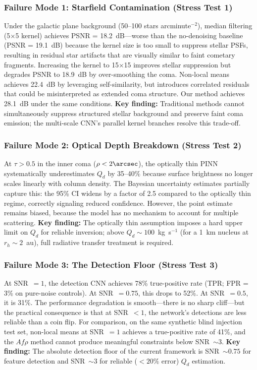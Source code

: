 \documentclass[usenatbib]{mnras}
\begin{document}
\subsubsection{Failure Mode 1: Starfield Contamination (Stress Test 1)}

Under the galactic plane background (50--100 stars arcminute$^{-2}$), median filtering (5$\times$5 kernel) achieves PSNR = 18.2~dB---worse than the no-denoising baseline (PSNR = 19.1~dB) because the kernel size is too small to suppress stellar PSFs, resulting in residual star artifacts that are visually similar to faint cometary fragments. Increasing the kernel to 15$\times$15 improves stellar suppression but degrades PSNR to 18.9~dB by over-smoothing the coma. Non-local means achieves 22.4~dB by leveraging self-similarity, but introduces correlated residuals that could be misinterpreted as extended coma structure. Our method achieves 28.1~dB under the same conditions. \textbf{Key finding:} Traditional methods cannot simultaneously suppress structured stellar background and preserve faint coma emission; the multi-scale CNN's parallel kernel branches resolve this trade-off.

\subsubsection{Failure Mode 2: Optical Depth Breakdown (Stress Test 2)}

At $\tau > 0.5$ in the inner coma ($\rho < 2\arcsec$), the optically thin PINN systematically underestimates $Q_d$ by 35--40\% because surface brightness no longer scales linearly with column density. The Bayesian uncertainty estimates partially capture this: the 95\% CI widens by a factor of 2.5 compared to the optically thin regime, correctly signaling reduced confidence. However, the point estimate remains biased, because the model has no mechanism to account for multiple scattering. \textbf{Key finding:} The optically thin assumption imposes a hard upper limit on $Q_d$ for reliable inversion; above $Q_d \sim 100$~kg~s$^{-1}$ (for a 1~km nucleus at $r_h \sim 2$~au), full radiative transfer treatment is required.

\subsubsection{Failure Mode 3: The Detection Floor (Stress Test 3)}

At SNR~$=1$, the detection CNN achieves 78\% true-positive rate (TPR; FPR = 3\% on pure-noise controls). At SNR~$=0.75$, this drops to 52\%. At SNR~$=0.5$, it is 31\%. The performance degradation is smooth---there is no sharp cliff---but the practical consequence is that at SNR~$<1$, the network's detections are less reliable than a coin flip. For comparison, on the same synthetic blind injection test set, non-local means at SNR~$=1$ achieves a true-positive rate of 41\%, and the $Af\rho$ method cannot produce meaningful constraints below SNR~$\sim 3$. \textbf{Key finding:} The absolute detection floor of the current framework is SNR~$\sim 0.75$ for feature detection and SNR~$\sim 3$ for reliable ($<20\%$ error) $Q_d$ estimation.
\end{document}
